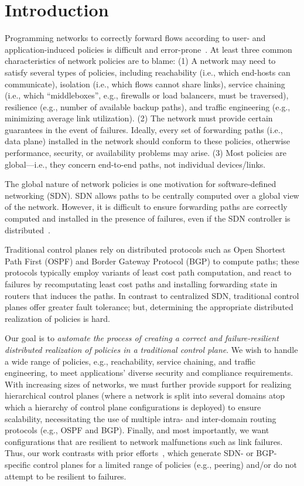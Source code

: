 \section{Introduction}
Programming networks to correctly forward flows according to user- and
application-induced policies is difficult and
error-prone~\cite{troubleshooting, bgpmisconfig}. At least three
common characteristics of network policies are to blame: (1) A network
may need to satisfy several types of policies, including reachability
(i.e., which end-hosts can communicate), isolation (i.e., which flows
cannot share links), service chaining (i.e., which ``middleboxes'',
e.g., firewalls or load balancers, must be traversed), resilience
(e.g., number of available backup paths), and traffic engineering
(e.g., minimizing average link utilization). (2) The network must
provide certain guarantees in the event of failures. Ideally, every
set of forwarding paths (i.e., data plane) installed in the network
should conform to these policies, otherwise performance, security, or
availability problems may arise. (3) Most policies are global---i.e.,
they concern end-to-end paths, not individual devices/links.

The global nature of network policies is one motivation for
software-defined networking (SDN). SDN allows paths to be centrally
computed over a global view of the network. However, it is difficult
to ensure forwarding paths are correctly computed and installed in the
presence of failures, even if the SDN controller is
distributed~\cite{hasdn}.

Traditional control planes rely on distributed protocols such as Open
Shortest Path First (OSPF) and Border Gateway Protocol (BGP) to
compute paths; these protocols typically employ variants of least cost
path computation, and react to failures by recomputating least cost
paths and installing forwarding state in routers that induces the
paths. In contrast to centralized SDN, traditional control planes
offer greater fault tolerance; but, determining the appropriate
distributed realization of policies is hard.

Our goal is to {\em automate the process of creating a correct and
  failure-resilient distributed realization of policies in a
  traditional control plane}. We wish to handle a wide range of
policies, e.g., reachability, service chaining, and traffic
engineering, to meet applications' diverse security and compliance
requirements.  With increasing sizes of networks, we must further
provide support for realizing hierarchical control planes (where a
network is split into several domains atop which a hierarchy of
control plane configurations is deployed) to ensure scalability,
necessitating the use of multiple intra- and inter-domain routing
protocols (e.g., OSPF and BGP).  Finally, and most importantly, we
want configurations that are resilient to network malfunctions such as
link failures.  Thus, our work contrasts with prior
efforts~\cite{netegg, propane, merlin,simple,fattire, netkat,
  netkatcompiler, sol}, which generate SDN- or BGP-specific control
planes for a limited range of policies (e.g., peering) and/or do not
attempt to be resilient to failures.



